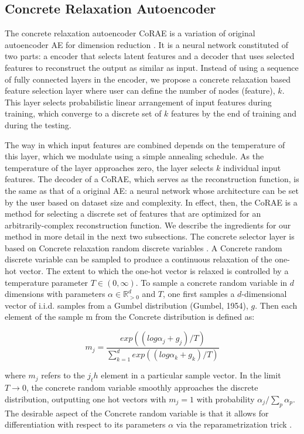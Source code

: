 \documentclass{bioinfo}
\newcommand{\R}{\mathbb{R}}
\begin{document}
\subsection{Concrete Relaxation Autoencoder}
The concrete relaxation autoencoder CoRAE is a variation of original autoencoder AE for dimension reduction \cite{hinton2006reducing}. It is a neural network constituted of two parts: a encoder that selects latent features and a decoder that uses selected features to reconstruct the output as similar as input. Instead of using a sequence of fully connected layers in the encoder,  we propose a concrete relaxation based feature selection layer where user can define the number of nodes (feature), $k$. This layer selects probabilistic linear arrangement of input features during training, which converge to a discrete set of $k$ features by the end of training and during the testing. 

The way in which input features are combined depends on the temperature of this layer, which we modulate using a simple annealing schedule. As the temperature of the layer approaches zero, the layer selects $k$ individual input features. The decoder of a CoRAE, which
serves as the reconstruction function, is the same as that of a
original AE: a neural network whose architecture
can be set by the user based on dataset size and complexity.
In effect, then, the CoRAE is a method for
selecting a discrete set of features that are optimized for an
arbitrarily-complex reconstruction function. We describe
the ingredients for our method in more detail in the next two
subsections.
The concrete selector layer is based on Concrete relaxation random
discrete variables \cite{maddison2016concrete, jang2016categorical}. A
Concrete random discrete variable can be sampled to produce a
continuous relaxation of the one-hot vector. The extent
to which the one-hot vector is relaxed is controlled by a
temperature parameter $T \in (0, \infty)$. To sample a concrete
random variable in $d$ dimensions with parameters $\alpha \in  \R ^d _{>0}$
and $T$, one first samples a $d$-dimensional vector of i.i.d.
samples from a Gumbel distribution (Gumbel, 1954), $g.$
Then each element of the sample m from the Concrete
distribution is defined as:

\begin{equation}
    m_j = \frac{exp((log \alpha_j + g_j)/T)}{\sum_{k=1} ^d exp((log \alpha_k + g_k)/T) }
\end{equation}

where $m_j$ refers to the $j_th$ element in a particular sample
vector. In the limit $T \to 0$, the concrete random variable
smoothly approaches the discrete distribution, outputting
one hot vectors with $m_j = 1$ with probability $\alpha _j/\sum_p \alpha _p$.
The desirable aspect of the Concrete random variable is that
it allows for differentiation with respect to its parameters $\alpha$
via the reparametrization trick \cite{kingma2013auto}.
\end{document}
